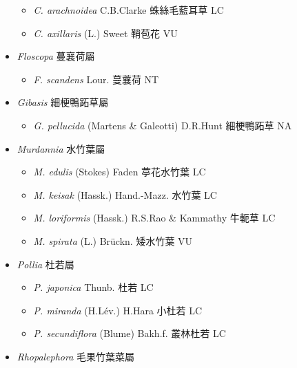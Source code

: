\begin{itemize}
  \begin{itemize}
        \item[] \textit{C. arachnoidea} C.B.Clarke  蛛絲毛藍耳草   LC
        \item[] \textit{C. axillaris} (L.) Sweet  鞘苞花   VU
  \end{itemize}
 \item[] \textit{Floscopa} 蔓襄荷屬
                                
  \begin{itemize}
        \item[] \textit{F. scandens} Lour.  蔓蘘荷   NT
  \end{itemize}
 \item[] \textit{Gibasis} 細梗鴨跖草屬
                                
  \begin{itemize}
        \item[] \textit{G. pellucida} (Martens \& Galeotti) D.R.Hunt  細梗鴨跖草   NA
  \end{itemize}
 \item[] \textit{Murdannia} 水竹葉屬
                                
  \begin{itemize}
        \item[] \textit{M. edulis} (Stokes) Faden  葶花水竹葉   LC
        \item[] \textit{M. keisak} (Hassk.) Hand.-Mazz.  水竹葉   LC
        \item[] \textit{M. loriformis} (Hassk.) R.S.Rao \& Kammathy  牛軛草   LC
        \item[] \textit{M. spirata} (L.) Brückn.  矮水竹葉   VU
  \end{itemize}
 \item[] \textit{Pollia} 杜若屬
                                
  \begin{itemize}
        \item[] \textit{P. japonica} Thunb.  杜若   LC
        \item[] \textit{P. miranda} (H.Lév.) H.Hara  小杜若   LC
        \item[] \textit{P. secundiflora} (Blume) Bakh.f.  叢林杜若   LC
  \end{itemize}
 \item[] \textit{Rhopalephora} 毛果竹葉菜屬
                                

\end{itemize}
